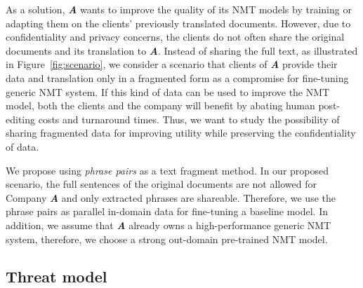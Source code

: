 As a solution, \textit{\textbf{A}} wants to improve the quality of its NMT models by training or adapting them on the clients' previously translated documents. However, due to confidentiality and privacy concerns, the clients do not often share the original documents and its translation to \textit{\textbf{A}}. Instead of sharing the full text, as illustrated in Figure~\ref{fig:scenario}, we consider a scenario that clients of \textit{\textbf{A}} provide their data and translation only in a fragmented form as a compromise for fine-tuning generic NMT system. If this kind of data can be used to improve the NMT model, both the clients and the company will benefit by abating human post-editing costs and turnaround times. Thus, we want to study the possibility of sharing fragmented data for improving utility while preserving the confidentiality of data. 

We propose using \textit{phrase pairs} as a text fragment method. In our proposed scenario, the full sentences of the original documents are not allowed for Company \textit{\textbf{A}} and only extracted phrases are shareable. Therefore, we use the phrase pairs as parallel in-domain data for fine-tuning a baseline model. In addition, we assume that \textit{\textbf{A}} already owns a high-performance generic NMT system, therefore, we choose a strong out-domain pre-trained NMT model. 


\subsection{Threat model}\label{section:threat_model}

